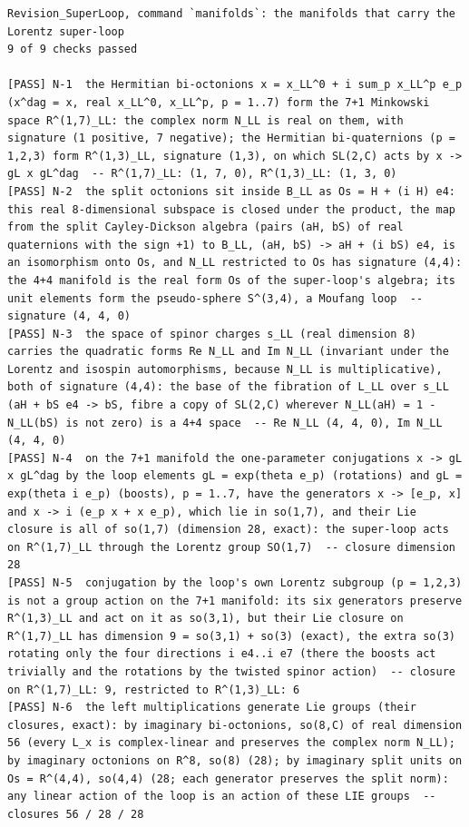 \documentclass[
  10pt,
]{article}
\begin{document}
\begin{verbatim}
Revision_SuperLoop, command `manifolds`: the manifolds that carry the Lorentz super-loop
9 of 9 checks passed

[PASS] N-1  the Hermitian bi-octonions x = x_LL^0 + i sum_p x_LL^p e_p (x^dag = x, real x_LL^0, x_LL^p, p = 1..7) form the 7+1 Minkowski space R^(1,7)_LL: the complex norm N_LL is real on them, with signature (1 positive, 7 negative); the Hermitian bi-quaternions (p = 1,2,3) form R^(1,3)_LL, signature (1,3), on which SL(2,C) acts by x -> gL x gL^dag  -- R^(1,7)_LL: (1, 7, 0), R^(1,3)_LL: (1, 3, 0)
[PASS] N-2  the split octonions sit inside B_LL as Os = H + (i H) e4: this real 8-dimensional subspace is closed under the product, the map from the split Cayley-Dickson algebra (pairs (aH, bS) of real quaternions with the sign +1) to B_LL, (aH, bS) -> aH + (i bS) e4, is an isomorphism onto Os, and N_LL restricted to Os has signature (4,4): the 4+4 manifold is the real form Os of the super-loop's algebra; its unit elements form the pseudo-sphere S^(3,4), a Moufang loop  -- signature (4, 4, 0)
[PASS] N-3  the space of spinor charges s_LL (real dimension 8) carries the quadratic forms Re N_LL and Im N_LL (invariant under the Lorentz and isospin automorphisms, because N_LL is multiplicative), both of signature (4,4): the base of the fibration of L_LL over s_LL (aH + bS e4 -> bS, fibre a copy of SL(2,C) wherever N_LL(aH) = 1 - N_LL(bS) is not zero) is a 4+4 space  -- Re N_LL (4, 4, 0), Im N_LL (4, 4, 0)
[PASS] N-4  on the 7+1 manifold the one-parameter conjugations x -> gL x gL^dag by the loop elements gL = exp(theta e_p) (rotations) and gL = exp(theta i e_p) (boosts), p = 1..7, have the generators x -> [e_p, x] and x -> i (e_p x + x e_p), which lie in so(1,7), and their Lie closure is all of so(1,7) (dimension 28, exact): the super-loop acts on R^(1,7)_LL through the Lorentz group SO(1,7)  -- closure dimension 28
[PASS] N-5  conjugation by the loop's own Lorentz subgroup (p = 1,2,3) is not a group action on the 7+1 manifold: its six generators preserve R^(1,3)_LL and act on it as so(3,1), but their Lie closure on R^(1,7)_LL has dimension 9 = so(3,1) + so(3) (exact), the extra so(3) rotating only the four directions i e4..i e7 (there the boosts act trivially and the rotations by the twisted spinor action)  -- closure on R^(1,7)_LL: 9, restricted to R^(1,3)_LL: 6
[PASS] N-6  the left multiplications generate Lie groups (their closures, exact): by imaginary bi-octonions, so(8,C) of real dimension 56 (every L_x is complex-linear and preserves the complex norm N_LL); by imaginary octonions on R^8, so(8) (28); by imaginary split units on Os = R^(4,4), so(4,4) (28; each generator preserves the split norm): any linear action of the loop is an action of these LIE groups  -- closures 56 / 28 / 28

\end{verbatim}
\end{document}
